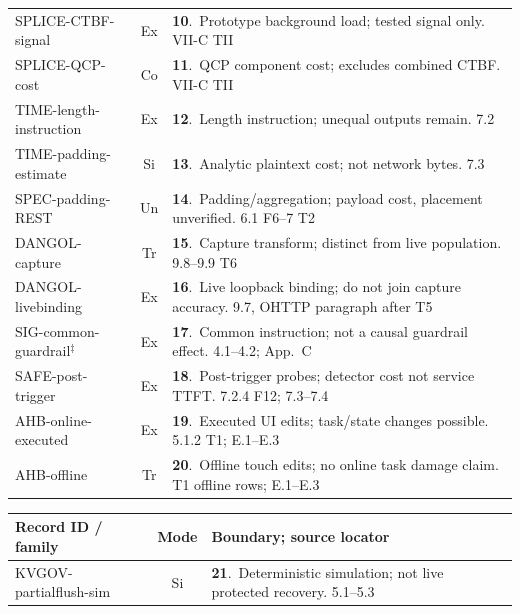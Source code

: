 \begin{table}[p]
\begin{minipage}[t]{0.495\textwidth}
\begin{tabularx}{\linewidth}{@{}p{.36\linewidth}cY@{}}
\textsf{SPLICE-CTBF-signal}~\cite{spliceleak2026} & Ex & \textbf{10}.~Prototype background load; tested signal only. VII-C TII\\
\textsf{SPLICE-QCP-cost}~\cite{spliceleak2026} & Co & \textbf{11}.~QCP component cost; excludes combined CTBF. VII-C TII\\
\textsf{TIME-length-instruction}~\cite{timewilltell2024} & Ex & \textbf{12}.~Length instruction; unequal outputs remain. 7.2\\
\textsf{TIME-padding-estimate}~\cite{timewilltell2024} & Si & \textbf{13}.~Analytic plaintext cost; not network bytes. 7.3\\
\textsf{SPEC-padding-REST}~\cite{wei2024speculation} & Un & \textbf{14}.~Padding/aggregation; payload cost, placement unverified. 6.1 F6--7 T2\\
\textsf{DANGOL-capture}~\cite{dangol2026workflow} & Tr & \textbf{15}.~Capture transform; distinct from live population. 9.8--9.9 T6\\
\textsf{DANGOL-livebinding}~\cite{dangol2026workflow} & Ex & \textbf{16}.~Live loopback binding; do not join capture accuracy. 9.7, OHTTP paragraph after T5\\
\textsf{SIG-common-guardrail}$^{\ddagger}$~\cite{geng2026sigleak} & Ex & \textbf{17}.~Common instruction; not a causal guardrail effect. 4.1--4.2; App.~C\\
\textsf{SAFE-post-trigger}~\cite{chu2025safekv} & Ex & \textbf{18}.~Post-trigger probes; detector cost not service TTFT. 7.2.4 F12; 7.3--7.4\\
\textsf{AHB-online-executed}~\cite{zhu2026turing} & Ex & \textbf{19}.~Executed UI edits; task/state changes possible. 5.1.2 T1; E.1--E.3\\
\textsf{AHB-offline}~\cite{zhu2026turing} & Tr & \textbf{20}.~Offline touch edits; no online task damage claim. T1 offline rows; E.1--E.3\\
\bottomrule\end{tabularx}
\end{minipage}\hfill
\begin{minipage}[t]{0.495\textwidth}\vspace{0pt}
\begin{tabularx}{\linewidth}{@{}p{.36\linewidth}cY@{}}\toprule
Record ID / family & Mode & Boundary; source locator\\\midrule
\textsf{KVGOV-partialflush-sim}~\cite{addagada2026kvgov} & Si & \textbf{21}.~Deterministic simulation; not live protected recovery. 5.1--5.3\\

\end{tabularx}
\end{minipage}
\end{table}
